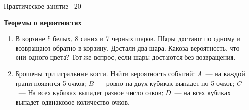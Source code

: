 \documentclass[a4paper,14pt]{extarticle}
\begin{document}
{\centering
{\small Практическое занятие \textnumero~20 \par}
{\bfseries Теоремы о вероятностях}
\par}
\begin{enumerate}
 
\item
В корзине 5 белых, 8 синих и 7 черных шаров. Шары достают по одному и
возвращают обратно в корзину. Достали два шара. Какова вероятность, что
они одного цвета? Тот же вопрос, если шары достаются без возвращения.
\item
Брошены три игральные кости. Найти вероятность событий: $A$~--- на каждой грани
появится 5 очков; 
$B$~--- ровно на двух кубиках выпадет по 5 очков;
$C$~--- На всех кубиках выпадет разное число очков;
$D$~--- на всех кубиках выпадет одинаковое количество очков.


\end{enumerate}
\end{document}
